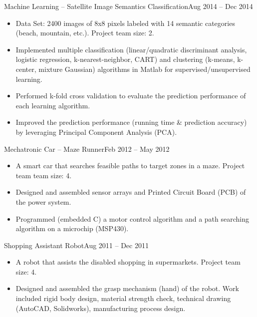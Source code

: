\documentclass[10pt,a4paper]{article}
\begin{document}
  \headedsection
  {Machine Learning -- Satellite Image Semantics Classification}{Aug 2014 --
    Dec 2014}{
    \begin{itemize}
    \item Data Set: 2400 images of 8x8 pixels labeled with 14 semantic
      categories (beach, mountain, etc.). Project team size: 2.
    \item Implemented multiple classification (linear/quadratic discriminant analysis,
      logistic regression, k-nearest-neighbor, CART) and clustering (k-means,
      k-center, mixture Gaussian) algorithms in Matlab for
      supervised/unsupervised learning.
    \item Performed k-fold cross validation to evaluate the prediction
      performance of each learning algorithm. 
    \item Improved the prediction performance (running time \& prediction
      accuracy) by leveraging Principal Component Analysis (PCA). 
    \end{itemize}
  }

  \headedsection
  {Mechatronic Car -- Maze Runner}{Feb 2012 -- May 2012}{
    \begin{itemize}
    \item A smart car that searches feasible paths to target zones in a maze.
      Project team team size: 4. 
      
    \item Designed and assembled sensor arrays and Printed Circuit Board (PCB)
      of the power system.
      
    \item Programmed (embedded C) a motor control algorithm and a path searching
      algorithm on a microchip (MSP430).

    \end{itemize}
  }

  \headedsection
  {Shopping Assistant Robot}{Aug 2011 -- Dec 2011}
  {
    \begin{itemize}
    \item A robot that assists the disabled shopping in supermarkets. Project
      team size: 4.
      
    \item Designed and assembled the grasp mechanism (hand) of the robot. Work
      included rigid body design, material strength check, technical drawing
      (AutoCAD, Solidworks), manufacturing process design.
    \end{itemize}
  }
\end{document}
